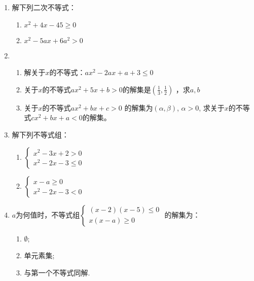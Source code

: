 \begin{enumerate}
    \item 解下列二次不等式：
\begin{multicols}{2}
\begin{enumerate}[(1)]
    \item $x^2+4x-45\ge 0$
    \item $x^2-5ax+6a^2>0$
\end{enumerate}
\end{multicols}

\item \begin{enumerate}[(1)]
    \item 解关于$x$的不等式：$ax^2-2ax+a+3\le 0$
\item 关于$x$的不等式$ax^2+5x+b>0$的解集是$\left(\frac13,\frac12\right)$
，求$a,b$

\item 关于$x$的不等式$ax^2+bx+c>0$ 的解集为$(\alpha,\beta)$, $\alpha >0$, 求关于$x$的不等式$cx^2+bx+a<0$的解集。
\end{enumerate} 

\item 解下列不等式组：
\begin{multicols}{2}
\begin{enumerate}[(1)]
    \item $\begin{cases}
        x^2-3x+2>0\\ x^2-2x-3\le 0
    \end{cases}$
    \item $\begin{cases}
        x-a\ge 0\\ x^2-2x-3<0
    \end{cases}$
\end{enumerate}
\end{multicols}
\item $a$为何值时，不等式组$\begin{cases}
    (x-2)(x-5)\le 0\\ x(x-a)\ge 0
\end{cases}$
的解集为：
\begin{multicols}{2}
\begin{enumerate}[(1)]
    \item $\emptyset$;
    \item 单元素集;
    \item 与第一个不等式同解.
\end{enumerate}
\end{multicols}


\end{enumerate}
